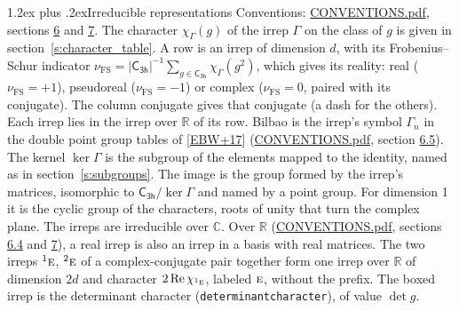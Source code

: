 \documentclass[10pt,a4paper]{article}
\makeatletter
\renewcommand\section{\@startsection{section}{1}{\z@}{-3ex plus -1ex minus -.2ex}%
  {1.2ex plus .2ex}{\normalfont\large\sffamily\bfseries\color{parttitle}}}
\numberwithin{equation}{section}
\newcommand{\grp}[1]{\mathsf{#1}}
\newcommand{\irr}[1]{\text{\normalfont\scshape #1}}
\newcommand{\conjpair}[1]{{}^{#1}}
\newcommand{\irchar}[1]{\chi_{#1}}
\newcommand{\fsind}{\nu_{\mathrm{FS}}}
\makeatother
\begin{document}
\section{Irreducible representations}\label{s:irreps}
Conventions: \href{../../CONVENTIONS.pdf}{CONVENTIONS.pdf}, sections \href{../../CONVENTIONS.pdf\#conv.6}{6} and \href{../../CONVENTIONS.pdf\#conv.7}{7}.
\leavevmode\label{n:function.character}\label{n:irrep.Gamma}The character $\irchar{\Gamma}(g)$ of the irrep $\Gamma$ on the class of $g$ is given in section~\ref{s:character_table}.
\leavevmode\label{n:index.dimension}\label{n:index.frobenius}\label{n:head.irrep}\label{n:head.reality}A row is an irrep of dimension $d$, with its Frobenius--Schur indicator $\fsind = |\grp{C_{3h}}|^{-1}\allowbreak\sum_{g\in\grp{C_{3h}}}\irchar{\Gamma}(g^2)$, which gives its reality: real ($\fsind = +1$), pseudoreal ($\fsind = -1$) or complex ($\fsind = 0$, paired with its conjugate). \label{n:head.conjugate}The column conjugate gives that conjugate (a dash for the others). \label{n:head.over.real}Each irrep lies in the irrep over $\mathbb{R}$ of its row. \label{n:head.bilbao}\label{n:irrep.alias.gamma}Bilbao is the irrep's symbol $\Gamma_n$ in the double point group tables of [\href{../../../REFERENCES.pdf\#ref.EBW+17}{EBW+17}] (\href{../../CONVENTIONS.pdf}{CONVENTIONS.pdf}, section \href{../../CONVENTIONS.pdf\#conv.6.5}{6.5}). \label{n:head.kernel}The kernel $\ker\Gamma$ is the subgroup of the elements mapped to the identity, named as in section~\ref{s:subgroups}. \label{n:head.image}The image is the group formed by the irrep's matrices, isomorphic to $\grp{C_{3h}}/\ker\Gamma$ and named by a point group. For dimension 1 it is the cyclic group of the characters, roots of unity that turn the complex plane. The irreps are irreducible over $\mathbb{C}$. Over $\mathbb{R}$ (\href{../../CONVENTIONS.pdf}{CONVENTIONS.pdf}, sections \href{../../CONVENTIONS.pdf\#conv.6.4}{6.4} and \href{../../CONVENTIONS.pdf\#conv.7}{7}), a real irrep is also an irrep in a basis with real matrices. The two irreps $\conjpair{1}\irr{e}$, $\conjpair{2}\irr{e}$ of a complex-conjugate pair together form one irrep over $\mathbb{R}$ of dimension $2d$ and character $2\operatorname{Re}\irchar{\conjpair{1}\irr{e}}$, labeled $\irr{e}$, without the prefix. \label{n:mark.determinant}The boxed irrep is the determinant character (\texttt{determinantcharacter}), of value $\det g$.
\setlength{\emergencystretch}{2em}\par\setlength{\emergencystretch}{0pt}
\end{document}
